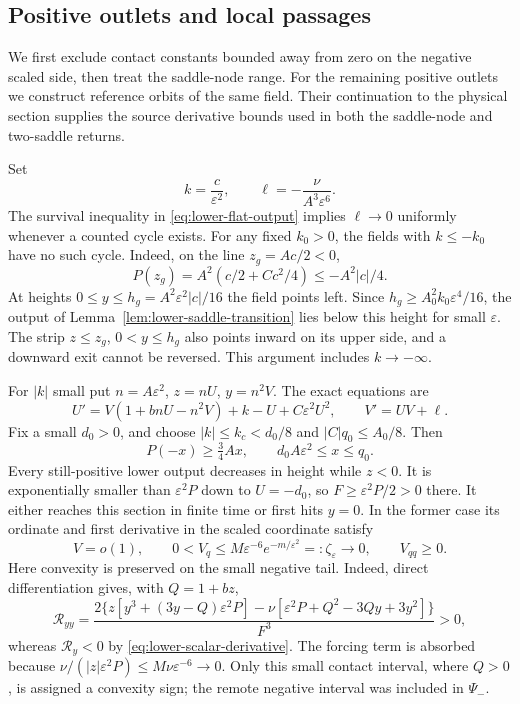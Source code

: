 \subsection{Positive outlets and local passages}

We first exclude contact constants bounded away from zero on the
negative scaled side, then treat the saddle-node range. For the remaining
positive outlets we construct reference orbits of the same field.
Their continuation to the physical section supplies the source derivative
bounds used in both the saddle-node and two-saddle returns.

Set
\begin{equation}\label{eq:lower-contact-parameters}
 k=\frac{c}{\varepsilon^2},\qquad
 \ell=-\frac{\nu}{A^3\varepsilon^6}.
\end{equation}
The survival inequality in \eqref{eq:lower-flat-output} implies
$\ell\to0$ uniformly whenever a counted cycle exists. For any fixed
$k_0>0$, the fields with $k\le-k_0$ have no such cycle. Indeed, on
the line $z_g=Ac/2<0$,
\[
 P(z_g)=A^2(c/2+Cc^2/4)\le-A^2|c|/4.
\]
At heights $0\le y\le h_g=A^2\varepsilon^2|c|/16$ the field points
left. Since $h_g\ge A_0^2k_0\varepsilon^4/16$, the output of
Lemma~\ref{lem:lower-saddle-transition} lies below this height for small
$\varepsilon$. The strip $z\le z_g$, $0<y\le h_g$ also points
inward on its upper side, and a downward exit cannot be reversed. This
argument includes $k\to-\infty$.

For $|k|$ small put $n=A\varepsilon^2$, $z=nU$, $y=n^2V$.
The exact equations are
\begin{equation}\label{eq:lower-epsilon-equations}
 U'=V(1+bnU-n^2V)+k-U+C\varepsilon^2U^2,\qquad V'=UV+\ell .
\end{equation}
Fix a small $d_0>0$, and choose $|k|\le k_c<d_0/8$ and
$|C|q_0\le A_0/8$. Then
\[
 P(-x)\ge\tfrac34 Ax,\qquad d_0A\varepsilon^2\le x\le q_0.
\]
Every still-positive lower output decreases in height while $z<0$.
It is exponentially smaller than $\varepsilon^2P$ down to $U=-d_0$,
so $F\ge\varepsilon^2P/2>0$ there. It either reaches this section
in finite time or first hits $y=0$. In the former case its ordinate and
first derivative in the scaled coordinate satisfy
\begin{equation}\label{eq:lower-central-small-entry}
 V=o(1),\qquad
 0<V_q\le M\varepsilon^{-6}e^{-m/\varepsilon^2}
       =:\zeta_\varepsilon\longrightarrow0,\qquad V_{qq}\ge0.
\end{equation}
Here convexity is preserved on the small negative tail. Indeed, direct
differentiation gives, with $Q=1+bz$,
\[
 \mathcal R_{yy}
 =\frac{2\{z[y^3+(3y-Q)\varepsilon^2P]
       -\nu[\varepsilon^2P+Q^2-3Qy+3y^2]\}}{F^3}>0,
\]
whereas $\mathcal R_y<0$ by \eqref{eq:lower-scalar-derivative}.
The forcing term is absorbed because
$\nu/(|z|\varepsilon^2P)\le M\nu\varepsilon^{-6}\to0$.
Only this small contact interval, where $Q>0$, is assigned a convexity
sign; the remote negative interval was included in $\Psi_-$.

